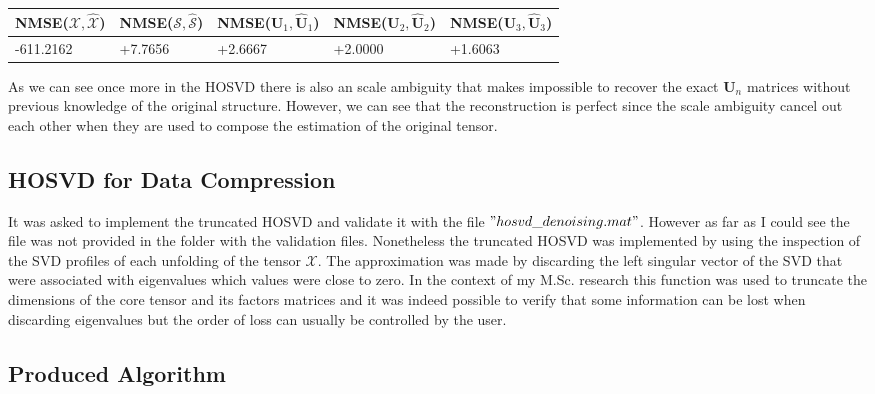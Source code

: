 \documentclass[a4paper,10pt]{article}
\begin{document}
    \begin{table}[ht!]
        \centering
        \begin{tabular}{|l|l|l|l|l|}
        \hline
        NMSE($\mathcal{X}, \mathcal{\hat{X}}$) & NMSE($\mathcal{S}, \mathcal{\hat{S}}$) & NMSE($\boldsymbol{U}_{1}, \boldsymbol{\hat{U}}_{1}$) & NMSE($\boldsymbol{U}_{2}, \boldsymbol{\hat{U}}_{2}$) & NMSE($\boldsymbol{U}_{3}, \boldsymbol{\hat{U}}_{3}$) \\ \hline
        -611.2162 & +7.7656 & +2.6667 & +2.0000 & +1.6063 \\ \hline
        \end{tabular}
    \end{table}

    As we can see once more in the HOSVD there is also an scale ambiguity that makes impossible to recover the exact 
    $\boldsymbol{U}_{n}$ matrices without previous knowledge of the original structure. However, we can see that the reconstruction is perfect since the scale ambiguity cancel out each
    other when they are used to compose the estimation of the original tensor.

    \subsection*{HOSVD for Data Compression}
    
    It was asked to implement the truncated HOSVD and validate it with the file $"hosvd\_denoising.mat"$. However as far as I could see the file was not provided in the folder with the validation files.
    Nonetheless the truncated HOSVD was implemented by using the inspection of the SVD profiles of each unfolding of the tensor $\mathcal{X}$. The approximation was made by discarding the left singular vector of the SVD
    that were associated with eigenvalues which values were close to zero. In the context of my M.Sc. research this function was used to truncate the dimensions of the core tensor and its factors matrices and it was indeed possible
    to verify that some information can be lost when discarding eigenvalues but the order of loss can usually be controlled by the user.

    \newpage
    \subsection*{Produced Algorithm}
\end{document}
